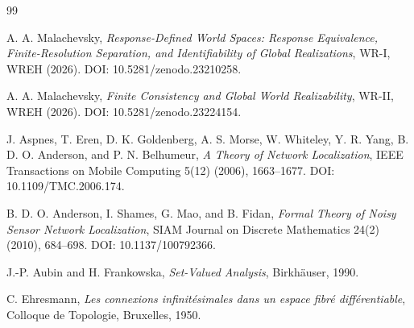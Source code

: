 \documentclass[11pt]{article}
\begin{document}
\begin{thebibliography}{99}

A. A. Malachevsky,
\emph{Response-Defined World Spaces: Response Equivalence,
Finite-Resolution Separation, and Identifiability of Global Realizations},
WR-I, WREH (2026).
DOI: 10.5281/zenodo.23210258.

A. A. Malachevsky,
\emph{Finite Consistency and Global World Realizability},
WR-II, WREH (2026).
DOI: 10.5281/zenodo.23224154.

J. Aspnes, T. Eren, D. K. Goldenberg, A. S. Morse, W. Whiteley,
Y. R. Yang, B. D. O. Anderson, and P. N. Belhumeur,
\emph{A Theory of Network Localization},
IEEE Transactions on Mobile Computing 5(12) (2006), 1663--1677.
DOI: 10.1109/TMC.2006.174.

B. D. O. Anderson, I. Shames, G. Mao, and B. Fidan,
\emph{Formal Theory of Noisy Sensor Network Localization},
SIAM Journal on Discrete Mathematics 24(2) (2010), 684--698.
DOI: 10.1137/100792366.

J.-P. Aubin and H. Frankowska,
\emph{Set-Valued Analysis},
Birkh\"auser, 1990.

C. Ehresmann,
\emph{Les connexions infinit\'esimales dans un espace fibr\'e
diff\'erentiable},
Colloque de Topologie, Bruxelles, 1950.

\end{thebibliography}
\end{document}

